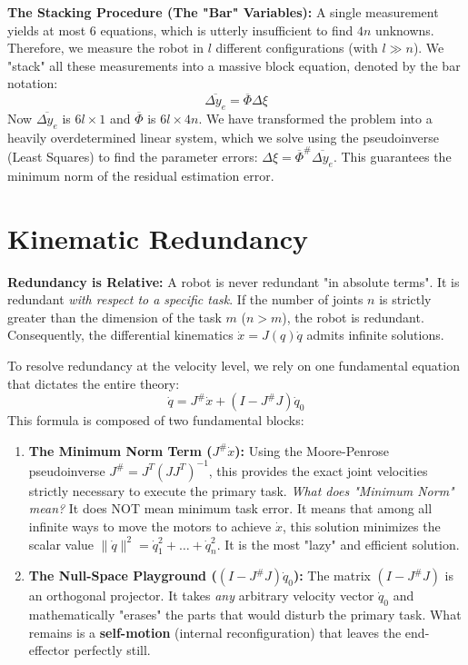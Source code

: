 \documentclass[11pt,a4paper]{article}
\begin{document}
\textbf{The Stacking Procedure (The "Bar" Variables):} A single measurement yields at most 6 equations, which is utterly insufficient to find $4n$ unknowns. Therefore, we measure the robot in $l$ different configurations (with $l \gg n$). We "stack" all these measurements into a massive block equation, denoted by the bar notation:
\begin{equation}
    \overline{\Delta y_e} = \overline{\Phi} \Delta \xi
\end{equation}
Now $\overline{\Delta y_e}$ is $6l \times 1$ and $\overline{\Phi}$ is $6l \times 4n$. We have transformed the problem into a heavily overdetermined linear system, which we solve using the pseudoinverse (Least Squares) to find the parameter errors: $\Delta \xi = \overline{\Phi}^\# \overline{\Delta y_e}$. This guarantees the minimum norm of the residual estimation error.

\section{Kinematic Redundancy}
\textbf{Redundancy is Relative:} A robot is never redundant "in absolute terms". It is redundant \textit{with respect to a specific task}. If the number of joints $n$ is strictly greater than the dimension of the task $m$ ($n > m$), the robot is redundant. Consequently, the differential kinematics $\dot{x} = J(q)\dot{q}$ admits infinite solutions.

To resolve redundancy at the velocity level, we rely on one fundamental equation that dictates the entire theory:
\begin{equation}
    \dot{q} = J^\# \dot{x} + (I - J^\# J)\dot{q}_0
\end{equation}
This formula is composed of two fundamental blocks:
\begin{enumerate}
    \item \textbf{The Minimum Norm Term ($J^\# \dot{x}$):} Using the Moore-Penrose pseudoinverse $J^\# = J^T(JJ^T)^{-1}$, this provides the exact joint velocities strictly necessary to execute the primary task. 
    \textit{What does "Minimum Norm" mean?} It does NOT mean minimum task error. It means that among all infinite ways to move the motors to achieve $\dot{x}$, this solution minimizes the scalar value $\|\dot{q}\|^2 = \dot{q}_1^2 + \dots + \dot{q}_n^2$. It is the most "lazy" and efficient solution.
    
    \item \textbf{The Null-Space Playground ($(I - J^\# J)\dot{q}_0$):} The matrix $(I - J^\# J)$ is an orthogonal projector. It takes \textit{any} arbitrary velocity vector $\dot{q}_0$ and mathematically "erases" the parts that would disturb the primary task. What remains is a \textbf{self-motion} (internal reconfiguration) that leaves the end-effector perfectly still.
\end{enumerate}
\end{document}
